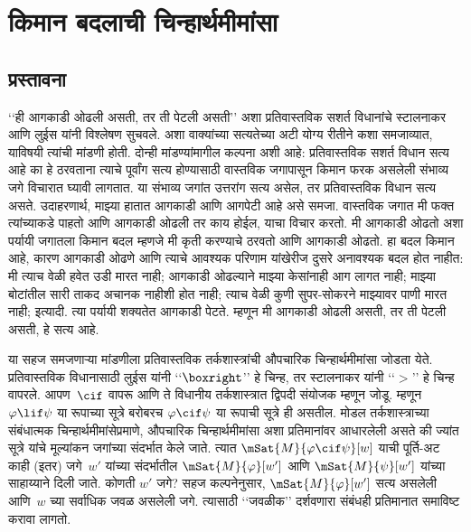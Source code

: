 \chapter{किमान बदलाची चिन्हार्थमीमांसा}\label{cnt:min:chap}










\section{प्रस्तावना}\label{cnt:min:int:sec}

‘‘ही आगकाडी ओढली असती, तर ती पेटली असती’’
अशा प्रतिवास्तविक सशर्त विधानांचे
स्टालनाकर आणि लुईस यांनी विश्लेषण सुचवले.
अशा वाक्यांच्या सत्यतेच्या अटी
योग्य रीतीने कशा समजाव्यात,
याविषयी त्यांची मांडणी होती.
दोन्ही मांडण्यांमागील कल्पना अशी आहे:
प्रतिवास्तविक सशर्त विधान सत्य आहे का
हे ठरवताना त्याचे पूर्वांग सत्य होण्यासाठी
वास्तविक जगापासून किमान फरक असलेली
संभाव्य जगे विचारात घ्यावी लागतात.
या संभाव्य जगांत उत्तरांग सत्य असेल,
तर प्रतिवास्तविक विधान सत्य असते.
उदाहरणार्थ, माझ्या हातात आगकाडी
आणि आगपेटी आहे असे समजा.
वास्तविक जगात मी फक्त त्यांच्याकडे
पाहतो आणि आगकाडी ओढली तर काय
होईल, याचा विचार करतो.
मी आगकाडी ओढतो अशा पर्यायी जगातला
किमान बदल म्हणजे मी कृती करण्याचे
ठरवतो आणि आगकाडी ओढतो.
हा बदल किमान आहे, कारण आगकाडी ओढणे आणि त्याचे
आवश्यक परिणाम यांखेरीज दुसरे अनावश्यक बदल होत नाहीत: मी त्याच वेळी
हवेत उडी मारत नाही; आगकाडी
ओढल्याने माझ्या केसांनाही आग
लागत नाही; माझ्या बोटांतील सारी
ताकद अचानक नाहीशी होत नाही;
त्याच वेळी कुणी सुपर-सोकरने
माझ्यावर पाणी मारत नाही;
इत्यादी. त्या पर्यायी शक्यतेत
आगकाडी पेटते. म्हणून मी
आगकाडी ओढली असती,
तर ती पेटली असती,
हे सत्य आहे.

या सहज समजणाऱ्या मांडणीला
प्रतिवास्तविक तर्कशास्त्रांची औपचारिक
चिन्हार्थमीमांसा जोडता येते.
प्रतिवास्तविक विधानासाठी लुईस यांनी
‘‘$\boxright$’’ हे चिन्ह, तर
स्टालनाकर यांनी ‘‘$>$’’ हे चिन्ह
वापरले. आपण~$\cif$ वापरू आणि
ते विधानीय तर्कशास्त्रात द्विपदी
संयोजक म्हणून जोडू.
म्हणून $\varphi \lif \psi$ या रूपाच्या
सूत्रे बरोबरच
$\varphi \cif \psi$ या रूपाची
सूत्रे ही असतील.
मोडल तर्कशास्त्राच्या संबंधात्मक
चिन्हार्थमीमांसेप्रमाणे, औपचारिक
चिन्हार्थमीमांसा अशा प्रतिमानांवर
आधारलेली असते की ज्यांत
सूत्रे यांचे मूल्यांकन जगांच्या
संदर्भात केले जाते. त्यात
$\mSat{M}{\varphi \cif \psi}[w]$
याची पूर्ति-अट काही (इतर) जगे~$w'$
यांच्या संदर्भातील
$\mSat{M}{\varphi}[w']$ आणि
$\mSat{M}{\psi}[w']$
यांच्या साहाय्याने दिली जाते.
कोणती $w'$ जगे?
सहज कल्पनेनुसार,
$\mSat{M}{\varphi}[w']$ सत्य असलेली
आणि~$w$ च्या सर्वाधिक जवळ
असलेली जगे. त्यासाठी
‘‘जवळीक’’ दर्शवणारा
संबंधही प्रतिमानात
समाविष्ट करावा लागतो.

